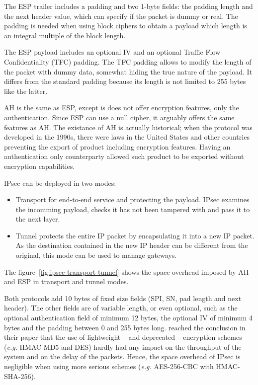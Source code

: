 \noindent The ESP trailer includes a padding and two 1-byte fields: the padding length and the next header value, which can specify if the packet is dummy or real.
The padding is needed when using block ciphers to obtain a payload which length is an integral multiple of the block length.

\noindent The ESP payload includes an optional IV and an optional Traffic Flow Confidentiality (TFC) padding.
The TFC padding allows to modify the length of the packet with dummy data, somewhat hiding the true nature of the payload.
It differs from the standard padding because its length is not limited to 255 bytes like the latter.

\noindent AH is the same as ESP, except is does not offer encryption features, only the authentication.
Since ESP can use a null cipher, it arguably offers the same features as AH.
The existance of AH is actually historical; when the protocol was developed in the 1990s, there were laws in the United States and other countries preventing the export of product including encryption features.
Having an authentication only counterparty allowed such product to be exported without encryption capabilities.\newline{}

IPsec can be deployed in two modes: 
\begin{itemize}
	\item Transport for end-to-end service and protecting the payload. IPsec examines the incomming payload, checks it has not been tampered with and pass it to the next layer.
	\item Tunnel protects the entire IP packet by encapsulating it into a new IP packet. As the destination contained in the new IP header can be different from the original, this mode can be used to manage gateways.
\end{itemize}
The figure~\ref{fig:ipsec-transport-tunnel} shows the space overhead imposed by AH and ESP in transport and tunnel modes.

Both protocols add 10 bytes of fixed size fields (SPI, SN, pad length and next header).
The other fields are of variable length, or even optional, such as the optional authentication field of minimum 12 bytes, the optional IV of minimum 4 bytes and the padding between 0 and 255 bytes long.
\citet{Xenakis20063225} reached the conclusion in their paper that the use of lightweight -- and deprecated -- encryption schemes (\textit{e.g.} HMAC-MD5 and DES) hardly had any impact on the throughput of the system and on the delay of the packets.
Hence, the space overhead of IPsec is negligible when using more serious schemes (\textit{e.g.} AES-256-CBC with HMAC-SHA-256).


